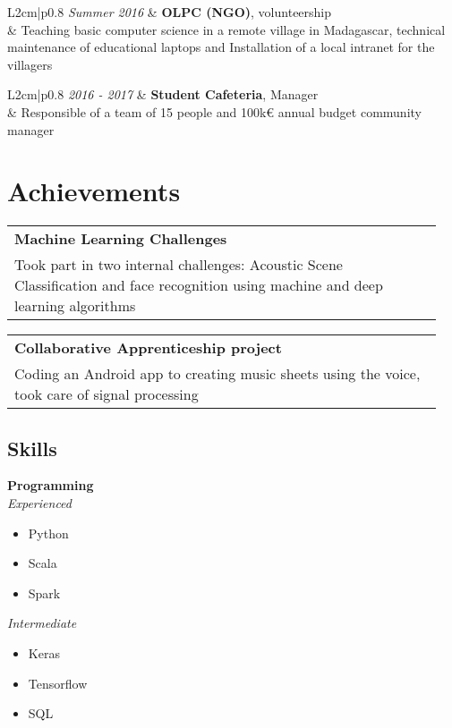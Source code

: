 \documentclass[a4paper,10.5pt]{article}
\begin{document}
\begin{paracol}{2}
\begin{leftcolumn}
			\begin{tabular}{L{2cm}|p{0.8\linewidth}}
				\textit{Summer 2016} & \textbf{OLPC (NGO)}, volunteership \\
				& Teaching basic computer science in a remote village in Madagascar, technical maintenance of educational laptops and Installation of a local intranet for the villagers
			\end{tabular}
			
			\begin{tabular}{L{2cm}|p{0.8\linewidth}}
				\textit{2016 - 2017} & \textbf{Student Cafeteria}, Manager \\
				& Responsible of a team of 15 people and 100k€ annual budget community manager
			\end{tabular}
					
			\vspace{0.2cm}
			
			\section*{Achievements}
			\begin{tabular}{|p{0.95\linewidth} }
				\textbf{Machine Learning Challenges} \\
				Took part in two internal challenges: Acoustic Scene Classification and face recognition using machine and deep learning algorithms
			\end{tabular}
		
			\begin{tabular}{|p{0.95\linewidth} }
				\textbf{Collaborative Apprenticeship project} \\
				Coding an Android app to creating music sheets using the voice, took care of signal processing 
			\end{tabular}
			
			
			\end{leftcolumn}
	
		\begin{rightcolumn}
			\section*{Skills}
			\textbf{Programming}  \\
			\textit{Experienced}
			\begin{itemize}
				\item Python
				\item Scala
				\item Spark
			\end{itemize}
			\textit{Intermediate}
			\begin{itemize}
				\item Keras
				\item Tensorflow
				\item SQL				
			\end{itemize}
			\vspace{0.2cm}
			

\end{rightcolumn}
\end{paracol}
\end{document}
